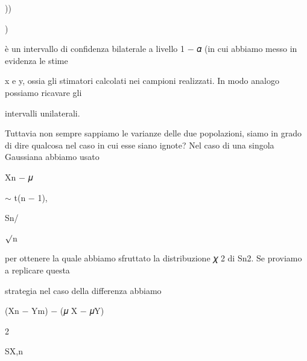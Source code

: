 \documentclass[a4paper,portrait,12pt]{article}
\begin{document}
))


)





\begin{flushleft}
\`{e} un intervallo di confidenza bilaterale a livello 1 $-$ 𝛼 (in cui abbiamo messo in evidenza le stime
\end{flushleft}


\begin{flushleft}
x e y, ossia gli stimatori calcolati nei campioni realizzati. In modo analogo possiamo ricavare gli
\end{flushleft}


\begin{flushleft}
intervalli unilaterali.
\end{flushleft}


\begin{flushleft}
Tuttavia non sempre sappiamo le varianze delle due popolazioni, siamo in grado di dire qualcosa nel caso in cui esse siano ignote? Nel caso di una singola Gaussiana abbiamo usato
\end{flushleft}


\begin{flushleft}
Xn $-$ 𝜇
\end{flushleft}


\begin{flushleft}
$\sim$ t(n $-$ 1),
\end{flushleft}


\begin{flushleft}
Sn/
\end{flushleft}


\begin{flushleft}
$\surd$n
\end{flushleft}


\begin{flushleft}
per ottenere la quale abbiamo sfruttato la distribuzione 𝜒 2 di Sn2. Se proviamo a replicare questa
\end{flushleft}


\begin{flushleft}
strategia nel caso della differenza abbiamo
\end{flushleft}


\begin{flushleft}
(Xn $-$ Ym) $-$ (𝜇 X $-$ 𝜇Y)
\end{flushleft}


2


\begin{flushleft}
SX,n
\end{flushleft}
\end{document}
